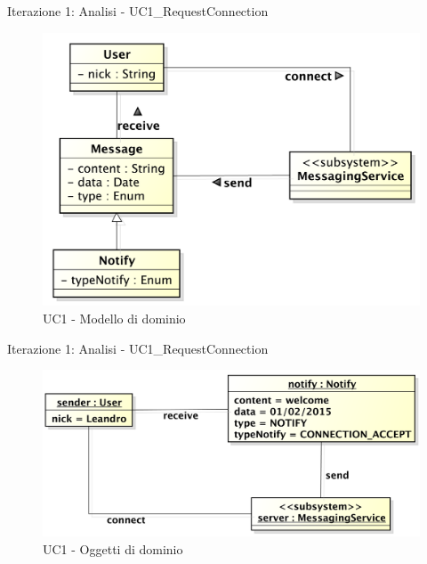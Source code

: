 \documentclass[t]{beamer} %
\begin{document}
\begin{frame} {Iterazione 1: Analisi - UC1\_RequestConnection}
   \begin{figure}
     \includegraphics[scale=0.34]{image_astah/Iteration_1_DomainModel/UC1_RequestConnection_DM.png}{\centering}
     \caption{UC1 - Modello di dominio}
     \label{fig_UC1_RC_DM} 
   \end{figure}
\end{frame}

\begin{frame} {Iterazione 1: Analisi - UC1\_RequestConnection}
   \begin{figure}
     \includegraphics[scale=0.35]{image_astah/Iteration_1_DomainModel/UC1_RequestConnection_OM}{\centering}
     \caption{UC1 - Oggetti di dominio}
     \label{fig_UC1_RC_OM} 
   \end{figure}
\end{frame}
\end{document}
